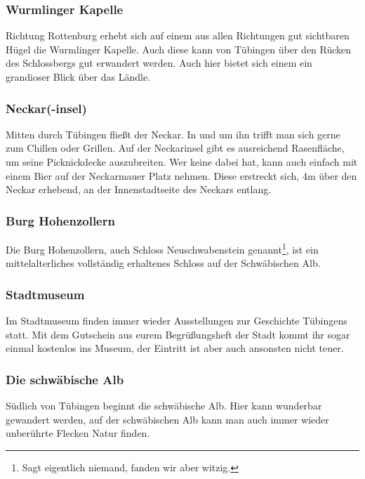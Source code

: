 \subsubsection*{Wurmlinger Kapelle}
Richtung Rottenburg erhebt sich auf einem aus allen Richtungen gut sichtbaren Hügel die Wurmlinger Kapelle. Auch diese kann von Tübingen über den Rücken des Schlossbergs gut erwandert werden. Auch hier bietet sich einem ein grandioser Blick über das Ländle.

\subsubsection*{Neckar(-insel)}
Mitten durch Tübingen fließt der Neckar. In und um ihn trifft man sich gerne zum Chillen oder Grillen. Auf der Neckarinsel gibt es ausreichend Rasenfläche, um seine Picknickdecke auszubreiten. Wer keine dabei hat, kann auch einfach mit einem Bier auf der Neckarmauer Platz nehmen. Diese erstreckt sich, 4m über den Neckar erhebend, an der Innenstadtseite des Neckars entlang.

\subsubsection*{Burg Hohenzollern}
Die Burg Hohenzollern, auch Schloss Neuschwabenstein genannt\footnote{Sagt eigentlich niemand, fanden wir aber witzig.}, ist ein mittelalterliches vollständig erhaltenes Schloss auf der Schwäbischen Alb.

\subsubsection*{Stadtmuseum}
Im Stadtmuseum finden immer wieder Ausstellungen zur Geschichte Tübingens statt. Mit dem Gutschein aus eurem Begrüßungsheft der Stadt kommt ihr sogar einmal kostenlos ins Museum, der Eintritt ist aber auch ansonsten nicht teuer.

\subsubsection*{Die schwäbische Alb}
Südlich von Tübingen beginnt die schwäbische Alb. Hier kann wunderbar gewandert werden, auf der schwäbischen Alb kann man auch immer wieder unberührte Flecken Natur finden.
\vfill